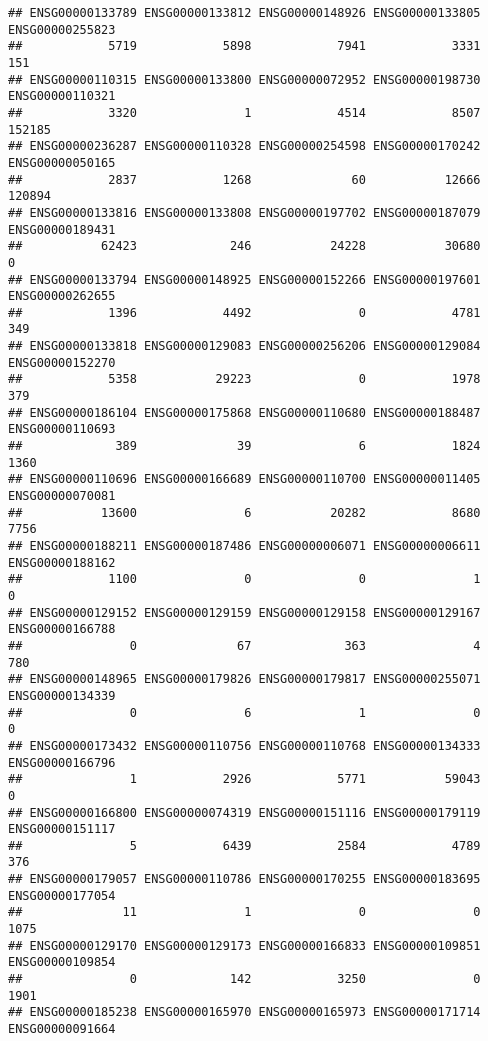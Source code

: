 \documentclass[
]{article}
\begin{document}
\begin{verbatim}
## ENSG00000133789 ENSG00000133812 ENSG00000148926 ENSG00000133805 ENSG00000255823 
##            5719            5898            7941            3331             151 
## ENSG00000110315 ENSG00000133800 ENSG00000072952 ENSG00000198730 ENSG00000110321 
##            3320               1            4514            8507          152185 
## ENSG00000236287 ENSG00000110328 ENSG00000254598 ENSG00000170242 ENSG00000050165 
##            2837            1268              60           12666          120894 
## ENSG00000133816 ENSG00000133808 ENSG00000197702 ENSG00000187079 ENSG00000189431 
##           62423             246           24228           30680               0 
## ENSG00000133794 ENSG00000148925 ENSG00000152266 ENSG00000197601 ENSG00000262655 
##            1396            4492               0            4781             349 
## ENSG00000133818 ENSG00000129083 ENSG00000256206 ENSG00000129084 ENSG00000152270 
##            5358           29223               0            1978             379 
## ENSG00000186104 ENSG00000175868 ENSG00000110680 ENSG00000188487 ENSG00000110693 
##             389              39               6            1824            1360 
## ENSG00000110696 ENSG00000166689 ENSG00000110700 ENSG00000011405 ENSG00000070081 
##           13600               6           20282            8680            7756 
## ENSG00000188211 ENSG00000187486 ENSG00000006071 ENSG00000006611 ENSG00000188162 
##            1100               0               0               1               0 
## ENSG00000129152 ENSG00000129159 ENSG00000129158 ENSG00000129167 ENSG00000166788 
##               0              67             363               4             780 
## ENSG00000148965 ENSG00000179826 ENSG00000179817 ENSG00000255071 ENSG00000134339 
##               0               6               1               0               0 
## ENSG00000173432 ENSG00000110756 ENSG00000110768 ENSG00000134333 ENSG00000166796 
##               1            2926            5771           59043               0 
## ENSG00000166800 ENSG00000074319 ENSG00000151116 ENSG00000179119 ENSG00000151117 
##               5            6439            2584            4789             376 
## ENSG00000179057 ENSG00000110786 ENSG00000170255 ENSG00000183695 ENSG00000177054 
##              11               1               0               0            1075 
## ENSG00000129170 ENSG00000129173 ENSG00000166833 ENSG00000109851 ENSG00000109854 
##               0             142            3250               0            1901 
## ENSG00000185238 ENSG00000165970 ENSG00000165973 ENSG00000171714 ENSG00000091664 

\end{verbatim}
\end{document}
